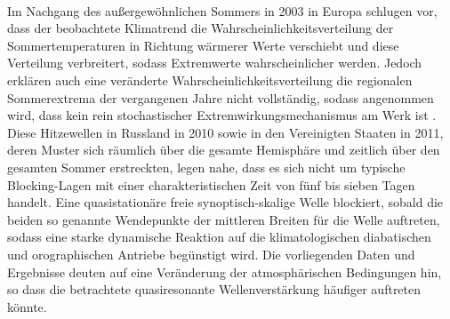 \citet{petoukhov-2013} \\
Im Nachgang des außergewöhnlichen Sommers in 2003 in Europa schlugen \citet{schär-2004} vor, dass der beobachtete Klimatrend die Wahrscheinlichkeitsverteilung der Sommertemperaturen in Richtung wärmerer Werte verschiebt und diese Verteilung verbreitert, sodass Extremwerte wahrscheinlicher werden.  Jedoch erklären auch eine veränderte Wahrscheinlichkeitsverteilung die regionalen Sommerextrema der vergangenen Jahre nicht vollständig, sodass angenommen wird, dass kein rein stochastischer Extremwirkungsmechanismus am Werk ist \citep{}. Diese Hitzewellen in Russland in 2010 sowie in den Vereinigten Staaten in 2011, deren Muster sich räumlich über die gesamte Hemisphäre und zeitlich über den gesamten Sommer erstreckten, legen nahe, dass es sich nicht um typische Blocking-Lagen mit einer charakteristischen Zeit von fünf bis sieben Tagen handelt. Eine quasistationäre freie synoptisch-skalige Welle blockiert, sobald die beiden so genannte Wendepunkte der mittleren Breiten  für die Welle auftreten, sodass eine starke dynamische Reaktion auf die klimatologischen diabatischen und orographischen Antriebe begünstigt wird. Die vorliegenden Daten und Ergebnisse deuten auf eine Veränderung der atmosphärischen Bedingungen hin, so dass die betrachtete quasiresonante Wellenverstärkung häufiger auftreten könnte.

